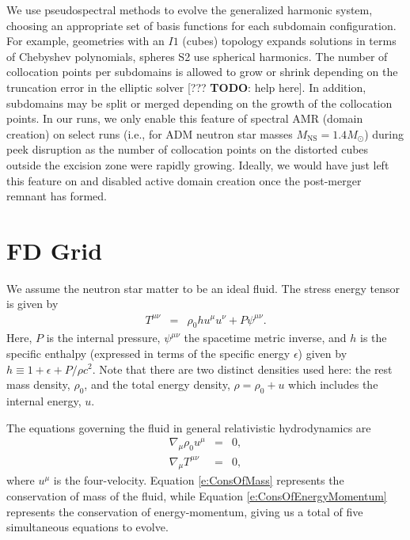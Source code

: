 We use pseudospectral methods to evolve the generalized harmonic system, choosing an appropriate set of basis functions for each subdomain configuration.  For example, geometries with an $I1$ (cubes) topology expands solutions in terms of Chebyshev polynomials, spheres S2 use spherical harmonics.  The number of collocation points per subdomains is allowed to grow or shrink depending on the truncation error in the elliptic solver [??? \textbf{TODO}: help here].  In addition, subdomains may be split or merged depending on the growth of the collocation points.  In our runs, we only enable this feature of spectral AMR (domain creation) on select runs (i.e., for ADM neutron star masses $M_\textrm{NS} = 1.4 M_\odot$) during peek disruption as the number of collocation points on the distorted cubes outside the excision zone were rapidly growing.  Ideally, we would have just left this feature on and disabled active domain creation once the post-merger remnant has formed.


\section{FD Grid}
\label{sec:fd-grid}

We assume the neutron star matter to be an ideal fluid.  The stress energy tensor is given by
\begin{eqnarray}
T^{\mu \nu} &=& \rho_0 h u^\mu u^\nu + P \psi^{\mu \nu}.
\label{e:StressEnergyTensor}
\end{eqnarray}
Here, $P$ is the internal pressure, $\psi^{\mu \nu}$ the spacetime metric inverse, and $h$ is the specific enthalpy (expressed in terms of the specific energy $\epsilon$) given by $h \equiv 1 + \epsilon + P/{\rho c^2}$.
Note that there are two distinct densities used here: the rest mass density, $\rho_0$, and the total energy density, $\rho = \rho_0 + u$ which includes the internal energy, $u$.

The equations governing the fluid in general relativistic hydrodynamics are
\begin{eqnarray}
\nabla_\mu \rho_0 u^\mu &=& 0, \label{e:ConsOfMass} \\
\nabla_\mu T^{\mu \nu} &=& 0, \label{e:ConsOfEnergyMomentum}
\end{eqnarray}
where $u^\mu$ is the four-velocity.  Equation \ref{e:ConsOfMass} represents the conservation of mass of the fluid, while Equation \ref{e:ConsOfEnergyMomentum} represents the conservation of energy-momentum, giving us a total of five simultaneous equations to evolve. 


